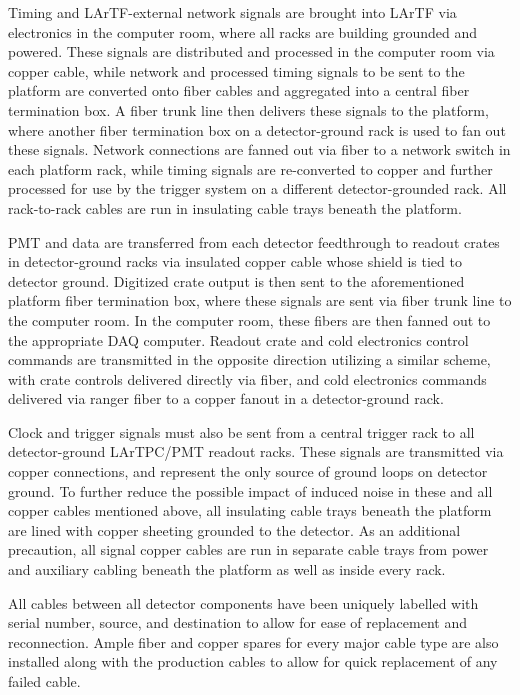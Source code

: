 Timing and LArTF-external network signals are brought into LArTF via electronics in the computer room, where all racks are building grounded and powered.  These signals are distributed and processed in the computer room via copper cable, while network and processed timing signals to be sent to the platform are converted onto fiber cables and aggregated into a central fiber termination box.  A fiber trunk line then delivers these signals to the platform, where another fiber termination box on a detector-ground rack is used to fan out these signals.  Network connections are fanned out via fiber to a network switch in each platform rack, while timing signals are re-converted to copper and further processed for use by the trigger system on a different detector-grounded rack.  All rack-to-rack cables are run in insulating cable trays beneath the platform.

PMT and \lartpc data are transferred from each detector feedthrough to readout crates in detector-ground racks via insulated copper cable whose shield is tied to detector ground.  Digitized crate output is then sent to the aforementioned platform fiber termination box, where these signals are sent via fiber trunk line to the computer room.  In the computer room, these fibers are then fanned out to the appropriate DAQ computer.  Readout crate and cold electronics control commands are transmitted in the opposite direction utilizing a similar scheme, with crate controls delivered directly via fiber, and cold electronics commands delivered via ranger fiber to a copper fanout in a detector-ground rack.

Clock and trigger signals must also be sent from a central trigger rack to all detector-ground LArTPC/PMT readout racks.  These signals are transmitted via copper connections, and represent the only source of ground loops on detector ground.  To further reduce the possible impact of induced noise in these and all copper cables mentioned above, all insulating cable trays beneath the platform are lined with copper sheeting grounded to the detector.  As an additional precaution, all \lartpc signal copper cables are run in separate cable trays from power and auxiliary cabling beneath the platform as well as inside every rack.

All cables between all detector components have been uniquely labelled with serial number, source, and destination to allow for ease of replacement and reconnection.  Ample fiber and copper spares for every major cable type are also installed along with the production cables to allow for quick replacement of any failed cable.


